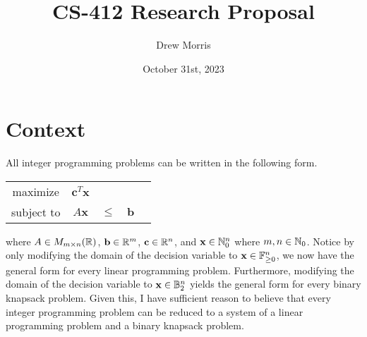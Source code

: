\documentclass[conference]{IEEEtran}
\title{CS-412 Research Proposal}
\author{Drew Morris}
\date{October 31st, 2023}
\numberwithin{equation}{section}
\numberwithin{figure}{section}
\theoremstyle{plain}
\theoremstyle{definition}
\newcommand{\R}{\ensuremath \mathbb{R}}
\newcommand{\N}{\ensuremath \mathbb{N}}
\newcommand{\F}{\ensuremath \mathbb{F}}
\newcommand{\B}{\ensuremath \mathbb{B}}
\begin{document}
\maketitle

\section{Context}
All integer programming problems can be written in the following form. \\
\begin{center}\begin{tabular}{ccccc}
  maximize   & $\mathbf{c}^T\mathbf{x}$ &        &              \\
  subject to & $A\mathbf{x}$            & $\leq$ & $\mathbf{b}$ \\
\end{tabular}\end{center}
where $A \in M_{m \times n}(\R)$, $\mathbf{b} \in \R^m$, $\mathbf{c} \in \R^n$, 
and $\mathbf{x} \in \N_0^n$ where $m,n \in \N_0$. Notice by only modifying the 
domain of the decision variable to $\mathbf{x} \in \F_{\geq 0}^n$, we now have 
the general form for every linear programming problem. Furthermore, modifying the 
domain of the decision variable to $\mathbf{x} \in \B_2^n$ yields the general 
form for every binary knapsack problem. Given this, I have sufficient reason to 
believe that every integer programming problem can be reduced to a system of a 
linear programming problem and a binary knapsack problem. \\
\end{document}
